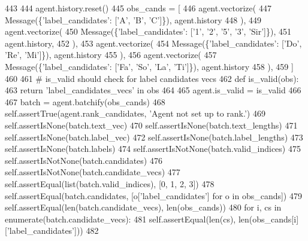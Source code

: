 \begin{DoxyCode}
443 
444         agent.history.reset()
445         obs\_cands = [
446             agent.vectorize(
447                 Message(\{\textcolor{stringliteral}{'label\_candidates'}: [\textcolor{stringliteral}{'A'}, \textcolor{stringliteral}{'B'}, \textcolor{stringliteral}{'C'}]\}), agent.history
448             ),
449             agent.vectorize(
450                 Message(\{\textcolor{stringliteral}{'label\_candidates'}: [\textcolor{stringliteral}{'1'}, \textcolor{stringliteral}{'2'}, \textcolor{stringliteral}{'5'}, \textcolor{stringliteral}{'3'}, \textcolor{stringliteral}{'Sir'}]\}),
451                 agent.history,
452             ),
453             agent.vectorize(
454                 Message(\{\textcolor{stringliteral}{'label\_candidates'}: [\textcolor{stringliteral}{'Do'}, \textcolor{stringliteral}{'Re'}, \textcolor{stringliteral}{'Mi'}]\}), agent.history
455             ),
456             agent.vectorize(
457                 Message(\{\textcolor{stringliteral}{'label\_candidates'}: [\textcolor{stringliteral}{'Fa'}, \textcolor{stringliteral}{'So'}, \textcolor{stringliteral}{'La'}, \textcolor{stringliteral}{'Ti'}]\}), agent.history
458             ),
459         ]
460 
461         \textcolor{comment}{# is\_valid should check for label candidates vecs}
462         \textcolor{keyword}{def }is\_valid(obs):
463             \textcolor{keywordflow}{return} \textcolor{stringliteral}{'label\_candidates\_vecs'} \textcolor{keywordflow}{in} obs
464 
465         agent.is\_valid = is\_valid
466 
467         batch = agent.batchify(obs\_cands)
468         self.assertTrue(agent.rank\_candidates, \textcolor{stringliteral}{'Agent not set up to rank.'})
469         self.assertIsNone(batch.text\_vec)
470         self.assertIsNone(batch.text\_lengths)
471         self.assertIsNone(batch.label\_vec)
472         self.assertIsNone(batch.label\_lengths)
473         self.assertIsNone(batch.labels)
474         self.assertIsNotNone(batch.valid\_indices)
475         self.assertIsNotNone(batch.candidates)
476         self.assertIsNotNone(batch.candidate\_vecs)
477         self.assertEqual(list(batch.valid\_indices), [0, 1, 2, 3])
478         self.assertEqual(batch.candidates, [o[\textcolor{stringliteral}{'label\_candidates'}] \textcolor{keywordflow}{for} o \textcolor{keywordflow}{in} obs\_cands])
479         self.assertEqual(len(batch.candidate\_vecs), len(obs\_cands))
480         \textcolor{keywordflow}{for} i, cs \textcolor{keywordflow}{in} enumerate(batch.candidate\_vecs):
481             self.assertEqual(len(cs), len(obs\_cands[i][\textcolor{stringliteral}{'label\_candidates'}]))
482 
\end{DoxyCode}
\mbox{\label{classtests_1_1test__torch__agent_1_1TestTorchAgent_a3c5504828399a2bb0d776baf1a744f71}} 
